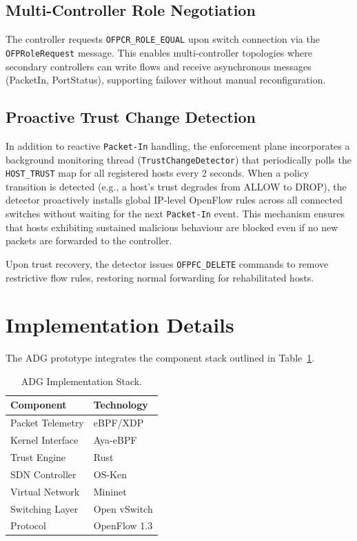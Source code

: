 \documentclass[conference]{IEEEtran}
\begin{document}
\subsection{Multi-Controller Role Negotiation}
The controller requests \texttt{OFPCR\_ROLE\_EQUAL} upon switch connection via the \texttt{OFPRoleRequest} message. This enables multi-controller topologies where secondary controllers can write flows and receive asynchronous messages (PacketIn, PortStatus), supporting failover without manual reconfiguration.

\subsection{Proactive Trust Change Detection}
In addition to reactive \texttt{Packet-In} handling, the enforcement plane incorporates a background monitoring thread (\texttt{TrustChangeDetector}) that periodically polls the \texttt{HOST\_TRUST} map for all registered hosts every 2 seconds. When a policy transition is detected (e.g., a host's trust degrades from ALLOW to DROP), the detector proactively installs global IP-level OpenFlow rules across all connected switches without waiting for the next \texttt{Packet-In} event. This mechanism ensures that hosts exhibiting sustained malicious behaviour are blocked even if no new packets are forwarded to the controller.

Upon trust recovery, the detector issues \texttt{OFPFC\_DELETE} commands to remove restrictive flow rules, restoring normal forwarding for rehabilitated hosts.


\section{Implementation Details}

The ADG prototype integrates the component stack outlined in Table~\ref{tab:stack}.

\begin{table}[h]
\centering
\caption{ADG Implementation Stack.}
\label{tab:stack}
\begin{tabular}{ll}
\toprule
Component & Technology \\
\midrule
Packet Telemetry & eBPF/XDP \\
Kernel Interface & Aya-eBPF \\
Trust Engine & Rust \\
SDN Controller & OS-Ken \\
Virtual Network & Mininet \\
Switching Layer & Open vSwitch \\
Protocol & OpenFlow 1.3 \\
\bottomrule
\end{tabular}
\end{table}
\end{document}
